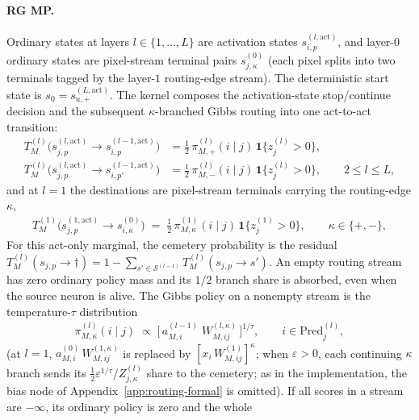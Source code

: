 \documentclass[twoside]{article}
\newcommand{\1}{\mathbf{1}}
\begin{document}
\paragraph{\ac{RG} MP.}
Ordinary states at layers $l \in \{1,\ldots,L\}$ are activation states
$s^{(l,\mathrm{act})}_{i,p}$, and layer-$0$ ordinary states are pixel-stream terminal pairs
$s^{(0)}_{j,\kappa}$ (each pixel splits into two terminals tagged by the layer-$1$ routing-edge
stream). The deterministic start state is $s_0 = s^{(L,\mathrm{act})}_{u,+}$. The kernel composes
the activation-state stop/continue decision and the subsequent $\kappa$-branched Gibbs routing into
one act-to-act transition:
\begin{align}
    T^{(l)}_M\bigl(s^{(l,\mathrm{act})}_{j,p} \to s^{(l-1,\mathrm{act})}_{i,p}\bigr)
    &= \tfrac12\,\pi^{(l)}_{M,+}(i \mid j)\,\1\{z_j^{(l)} > 0\},
    \nonumber \\
    T^{(l)}_M\bigl(s^{(l,\mathrm{act})}_{j,p} \to s^{(l-1,\mathrm{act})}_{i,p'}\bigr)
    &= \tfrac12\,\pi^{(l)}_{M,-}(i \mid j)\,\1\{z_j^{(l)} > 0\},
    \qquad 2 \le l \le L,
    \label{eq:rg-T-act}
\end{align}
and at $l = 1$ the destinations are pixel-stream terminals carrying the routing-edge $\kappa$,
\begin{align}\label{eq:rg-T-pixel}
    T^{(1)}_M\bigl(s^{(1,\mathrm{act})}_{j,p} \to s^{(0)}_{i,\kappa}\bigr)
    \;=\; \tfrac12\,\pi^{(1)}_{M,\kappa}(i \mid j)\,\1\{z_j^{(1)} > 0\},
    \qquad \kappa \in \{+,-\},
\end{align}
For this act-only marginal, the cemetery probability is the residual
$T^{(l)}_M(s_{j,p}\to\dagger)=1-\sum_{s'\in\mathcal S^{(l-1)}}T^{(l)}_M(s_{j,p}\to s')$.
An empty routing stream has zero ordinary policy mass and its $1/2$ branch share
is absorbed, even when the source neuron is alive. The Gibbs policy on a nonempty
stream is the temperature-$\tau$
distribution
\begin{align}\label{eq:rg-T}
    \pi^{(l)}_{M,\kappa}(i \mid j)
    \;\propto\;
    \bigl[\,a^{(l-1)}_{M,i}\;W^{(l,\kappa)}_{M,ij}\,\bigr]^{1/\tau},
    \qquad i \in \mathrm{Pred}_j^{(l)},
\end{align}
(at $l = 1$, $a_{M,i}^{(0)}\,W^{(1,\kappa)}_{M,ij}$ is replaced by $[x_i\,W^{(1)}_{M,ij}]^\kappa$;
when $\varepsilon>0$, each continuing $\kappa$ branch sends its
$\tfrac12\varepsilon^{1/\tau}/Z^{(l)}_{j,\kappa}$ share to the cemetery; as in the
implementation, the bias node of Appendix~\ref{app:routing-formal} is omitted).
If all scores in a stream are $-\infty$, its ordinary policy is zero and the whole
\end{document}
